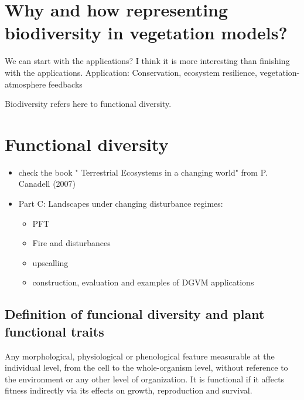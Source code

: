 \documentclass[
  oneside]{book}
\providecommand{\tightlist}{%
  \setlength{\itemsep}{0pt}\setlength{\parskip}{0pt}}
\begin{document}

\hypertarget{why-and-how-representing-biodiversity-in-vegetation-models}{%
\section{Why and how representing biodiversity in vegetation models?}\label{why-and-how-representing-biodiversity-in-vegetation-models}}

We can start with the applications? I think it is more interesting than finishing with the applications.
Application: Conservation, ecosystem resilience, vegetation-atmosphere feedbacks

Biodiversity refers here to functional diversity.

\hypertarget{functional-diversity}{%
\section{Functional diversity}\label{functional-diversity}}

\begin{itemize}
\tightlist
\item
  check the book " Terrestrial Ecosystems in a changing world" from P. Canadell (2007)
\item
  Part C: Landscapes under changing disturbance regimes:

  \begin{itemize}
  \tightlist
  \item
    PFT
  \item
    Fire and disturbances
  \item
    upscalling
  \item
    construction, evaluation and examples of DGVM applications
  \end{itemize}
\end{itemize}

\hypertarget{definition-of-funcional-diversity-and-plant-functional-traits}{%
\subsection{Definition of funcional diversity and plant functional traits}\label{definition-of-funcional-diversity-and-plant-functional-traits}}

Any morphological, physiological or phenological feature measurable at the individual level, from the cell to the whole-organism level, without reference to the environment or any other level of organization.
It is functional if it affects fitness indirectly via its effects on growth, reproduction and survival.
\end{document}

